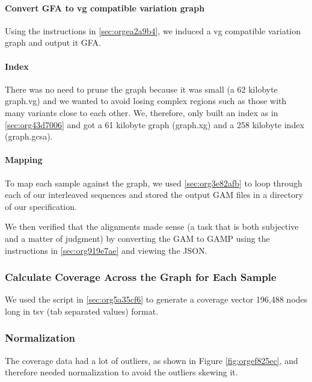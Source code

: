 \documentclass[10pt, a4paper]{article}
\begin{document}
\paragraph{Convert GFA to vg compatible variation graph}
\label{sec:orgfcc71e4}
Using the instructions in \ref{sec:orgea2a9b4}, we induced a vg 
\cite{garrisonVariationGraphToolkit2018} compatible variation graph and output it 
GFA.

\paragraph{Index}
\label{sec:orgda09947}
There was no need to prune the graph because it was small 
(a 62 kilobyte graph.vg) and we wanted to avoid losing complex regions such as 
those with many variants close to each other.
We, therefore, only built an index as in \ref{sec:org43d7006} and got a 61
kilobyte graph (graph.xg) and a 258 kilobyte index (graph.gcsa).

\paragraph{Mapping}
\label{sec:orgb31fccf}
To map each sample against the graph, we used \ref{sec:org3e82afb} to loop through 
each of our interleaved sequences and stored the output GAM files in a 
directory of our specification.

We then verified that the alignments made sense
(a task that is both subjective and a matter of judgment) by converting the GAM 
to GAMP using the instructions in  \ref{sec:org919e7ae} and viewing the JSON.

\subsubsection{Calculate Coverage Across the Graph for Each Sample}
\label{sec:org5a715a5}
We used the script in \ref{sec:org5a35cf6} to generate a coverage vector 196,488 nodes
long in tsv (tab separated values) format.

\subsubsection{Normalization}
\label{sec:orge65c9ca}
The coverage data had a lot of outliers, as shown in Figure
\ref{fig:orgef825ec}, and therefore needed normalization to avoid the outliers
skewing it.
\end{document}
